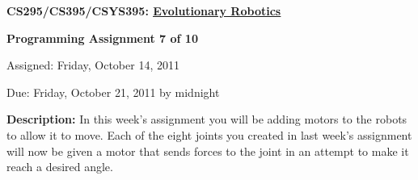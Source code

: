 \documentclass[12pt]{article}
\begin{document}
\centerline{\bf \Large CS295/CS395/CSYS395: \href{CS295_395_Syllabus.pdf}{\underline{Evolutionary Robotics}}}

\vspace{0.5cm}

\centerline{\bf \large Programming Assignment 7 of 10}

\vspace{0.5cm}

\centerline{\large Assigned: Friday, October 14, 2011}

\vspace{0.5cm}

\centerline{\large Due: Friday, October 21, 2011 by midnight}

\vspace{0.5cm}

\noindent \textbf{Description:} In this week's assignment you will be adding motors to the robots to allow it to move. Each of the eight joints you created in last week's assignment will now be given a motor that sends forces to the joint in an attempt to make it reach a desired angle.
\end{document}
